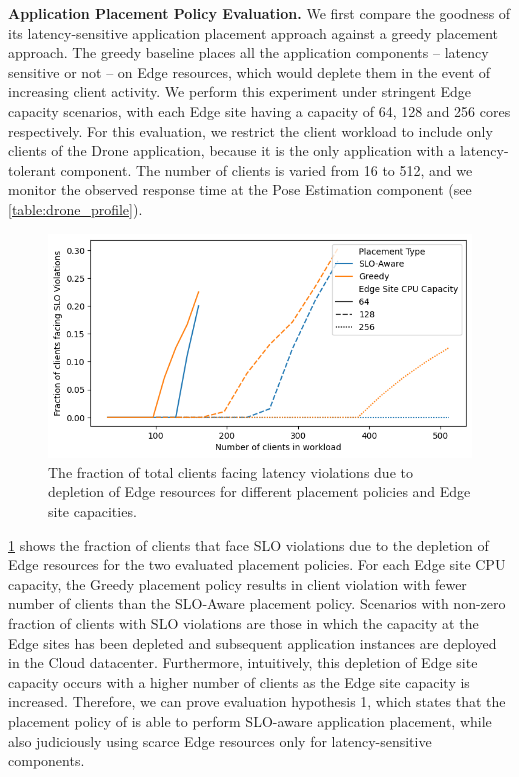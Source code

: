 \par \noindent \textbf{Application Placement Policy Evaluation. }We first compare the goodness of its latency-sensitive application placement approach against a greedy placement approach.  The greedy baseline places all the application components -- latency sensitive or not  -- on Edge resources, which would deplete them in the event of increasing client activity. We perform this experiment under stringent Edge capacity scenarios, with each Edge site having a capacity of 64, 128 and 256 cores respectively. For this evaluation, we restrict the client workload to include only clients of the Drone application, because it is the only application with a latency-tolerant component. The number of clients is varied from 16 to 512, and we monitor the observed response time at the Pose Estimation component (see \cref{table:drone_profile}). 
\begin{figure}[ht]
  \centering
    \includegraphics[width=0.8\columnwidth]{figures/oneedge/violations_wrt_greedy_vs_num_clients.png}
    \caption{The fraction of total clients facing latency violations due to depletion of Edge resources for different placement policies and Edge site capacities.}
    \label{fig:oneedge_placement}
\end{figure}
\cref{fig:oneedge_placement} shows the fraction of clients that face SLO violations due to the depletion of Edge resources for the two evaluated placement policies. For each Edge site CPU capacity, the Greedy placement policy results in client violation with fewer number of clients than the SLO-Aware placement policy. Scenarios with non-zero fraction of clients with SLO violations are those in which the capacity at the Edge sites has been depleted and subsequent application instances are deployed in the Cloud datacenter. Furthermore, intuitively, this depletion of Edge site capacity occurs with a higher number of clients as the Edge site capacity is increased. Therefore, we can prove evaluation hypothesis 1, which states that the placement policy of \oneedge{} is able to perform SLO-aware application placement, while also judiciously using scarce Edge resources only for latency-sensitive components.\\

